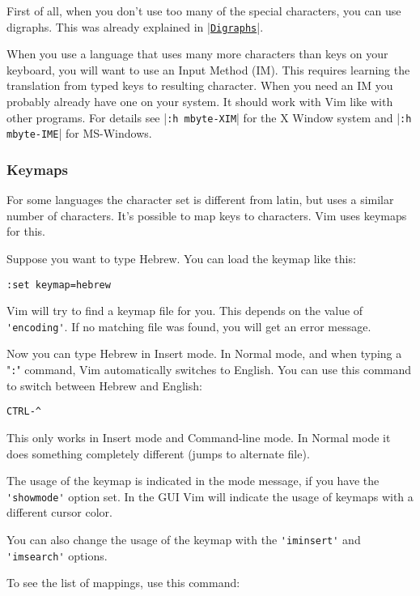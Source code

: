 First of all, when you don't use too many of the special characters, you can use digraphs.
This was already explained in |\hyperref[Digraphs]{\texttt{Digraphs}}|.

When you use a language that uses many more characters than keys on your keyboard, you will want to use an Input Method (IM).
This requires learning the translation from typed keys to resulting character.
When you need an IM you probably already have one on your system.
It should work with Vim like with other programs.
For details see |\verb!:h mbyte-XIM!| for the X Window system and |\verb!:h mbyte-IME!| for MS-Windows.

\subsubsection{Keymaps}
For some languages the character set is different from latin, but uses a similar number of characters.
It's possible to map keys to characters.
Vim uses keymaps for this.

Suppose you want to type Hebrew.
You can load the keymap like this:

\begin{Verbatim}[samepage=true]
 :set keymap=hebrew
\end{Verbatim}

Vim will try to find a keymap file for you.
This depends on the value of \verb!'encoding'!.
If no matching file was found, you will get an error message.

Now you can type Hebrew in Insert mode.
In Normal mode, and when typing a "\verb!:!" command, Vim automatically switches to English.
You can use this command to switch between Hebrew and English:

\begin{Verbatim}[samepage=true]
 CTRL-^
\end{Verbatim}

This only works in Insert mode and Command-line mode.
In Normal mode it does something completely different (jumps to alternate file).

The usage of the keymap is indicated in the mode message, if you have the \verb!'showmode'! option set.
In the GUI Vim will indicate the usage of keymaps with a different cursor color.

You can also change the usage of the keymap with the \verb!'iminsert'! and \verb!'imsearch'! options.

To see the list of mappings, use this command:

